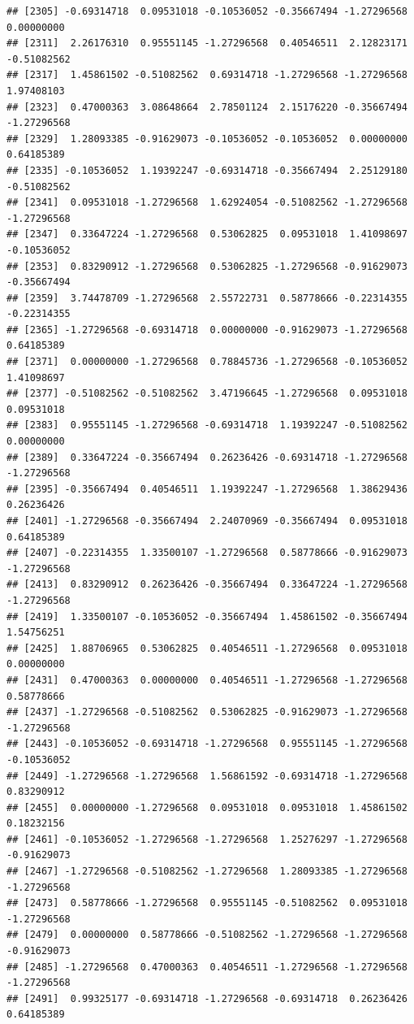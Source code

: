 \documentclass[
]{article}
\begin{document}
\begin{verbatim}
## [2305] -0.69314718  0.09531018 -0.10536052 -0.35667494 -1.27296568  0.00000000
## [2311]  2.26176310  0.95551145 -1.27296568  0.40546511  2.12823171 -0.51082562
## [2317]  1.45861502 -0.51082562  0.69314718 -1.27296568 -1.27296568  1.97408103
## [2323]  0.47000363  3.08648664  2.78501124  2.15176220 -0.35667494 -1.27296568
## [2329]  1.28093385 -0.91629073 -0.10536052 -0.10536052  0.00000000  0.64185389
## [2335] -0.10536052  1.19392247 -0.69314718 -0.35667494  2.25129180 -0.51082562
## [2341]  0.09531018 -1.27296568  1.62924054 -0.51082562 -1.27296568 -1.27296568
## [2347]  0.33647224 -1.27296568  0.53062825  0.09531018  1.41098697 -0.10536052
## [2353]  0.83290912 -1.27296568  0.53062825 -1.27296568 -0.91629073 -0.35667494
## [2359]  3.74478709 -1.27296568  2.55722731  0.58778666 -0.22314355 -0.22314355
## [2365] -1.27296568 -0.69314718  0.00000000 -0.91629073 -1.27296568  0.64185389
## [2371]  0.00000000 -1.27296568  0.78845736 -1.27296568 -0.10536052  1.41098697
## [2377] -0.51082562 -0.51082562  3.47196645 -1.27296568  0.09531018  0.09531018
## [2383]  0.95551145 -1.27296568 -0.69314718  1.19392247 -0.51082562  0.00000000
## [2389]  0.33647224 -0.35667494  0.26236426 -0.69314718 -1.27296568 -1.27296568
## [2395] -0.35667494  0.40546511  1.19392247 -1.27296568  1.38629436  0.26236426
## [2401] -1.27296568 -0.35667494  2.24070969 -0.35667494  0.09531018  0.64185389
## [2407] -0.22314355  1.33500107 -1.27296568  0.58778666 -0.91629073 -1.27296568
## [2413]  0.83290912  0.26236426 -0.35667494  0.33647224 -1.27296568 -1.27296568
## [2419]  1.33500107 -0.10536052 -0.35667494  1.45861502 -0.35667494  1.54756251
## [2425]  1.88706965  0.53062825  0.40546511 -1.27296568  0.09531018  0.00000000
## [2431]  0.47000363  0.00000000  0.40546511 -1.27296568 -1.27296568  0.58778666
## [2437] -1.27296568 -0.51082562  0.53062825 -0.91629073 -1.27296568 -1.27296568
## [2443] -0.10536052 -0.69314718 -1.27296568  0.95551145 -1.27296568 -0.10536052
## [2449] -1.27296568 -1.27296568  1.56861592 -0.69314718 -1.27296568  0.83290912
## [2455]  0.00000000 -1.27296568  0.09531018  0.09531018  1.45861502  0.18232156
## [2461] -0.10536052 -1.27296568 -1.27296568  1.25276297 -1.27296568 -0.91629073
## [2467] -1.27296568 -0.51082562 -1.27296568  1.28093385 -1.27296568 -1.27296568
## [2473]  0.58778666 -1.27296568  0.95551145 -0.51082562  0.09531018 -1.27296568
## [2479]  0.00000000  0.58778666 -0.51082562 -1.27296568 -1.27296568 -0.91629073
## [2485] -1.27296568  0.47000363  0.40546511 -1.27296568 -1.27296568 -1.27296568
## [2491]  0.99325177 -0.69314718 -1.27296568 -0.69314718  0.26236426  0.64185389

\end{verbatim}
\end{document}
